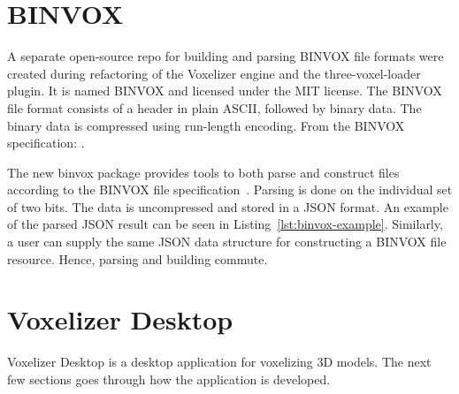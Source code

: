 \section{BINVOX}
\label{sec:method-binvox}
A separate open-source repo for building and parsing BINVOX file formats were created during refactoring of the Voxelizer engine and the three-voxel-loader plugin. It is named BINVOX and licensed under the MIT license. The BINVOX file format consists of a header in plain ASCII, followed by binary data. The binary data is compressed using run-length encoding. From the BINVOX specification: .

The new binvox package provides tools to both parse and construct files according to the BINVOX file specification~\cite{binvox-file-format}. Parsing is done on the individual set of two bits. The data is uncompressed and stored in a JSON format. An example of the parsed JSON result can be seen in Listing~\ref{lst:binvox-example}. Similarly, a user can supply the same JSON data structure for constructing a BINVOX file resource. Hence, parsing and building commute.


\section{Voxelizer Desktop}
Voxelizer Desktop is a desktop application for voxelizing 3D models. The next few sections goes through how the application is developed.

